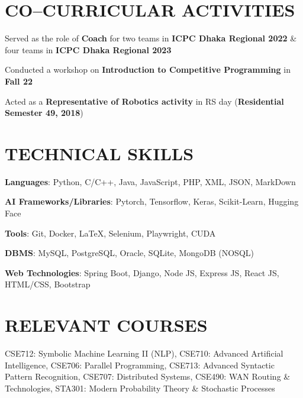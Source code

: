 \documentclass[letterpaper,10.5pt]{article}
\begin{document}
\newpage
\section{CO--CURRICULAR ACTIVITIES}

\begin{itemize}[leftmargin=0.2in, label={}, parsep=-3pt]
  \small{
  \item [\ding{109}]{
        Served as the role of \textbf{Coach} for two teams in \textbf{ICPC Dhaka Regional 2022} \& four teams in \textbf{ICPC Dhaka Regional 2023}} \\
  \item [\ding{109}]{Conducted a workshop on \textbf{Introduction to Competitive Programming} in \textbf{Fall 22}}
  \item [\ding{109}]{Acted as a \textbf{Representative of Robotics activity} in RS day (\textbf{Residential Semester 49, 2018})}
        }
\end{itemize}
\vspace{-16pt}


\section{TECHNICAL SKILLS}
\vspace{-0.5pt}
\begin{itemize}[leftmargin=0in, label={}, parsep=-2pt]
  \small{\item{
                \textbf{Languages}{: Python, C/C++, Java, JavaScript, PHP, XML, JSON, MarkDown}}
    \item{\textbf{AI Frameworks/Libraries}{: Pytorch, Tensorflow, Keras, Scikit-Learn, Hugging Face}}
    \item{\textbf{Tools}{: Git, Docker, \LaTeX, Selenium, Playwright, CUDA}}
    \item{\textbf{DBMS}{: MySQL, PostgreSQL, Oracle, SQLite, MongoDB (NOSQL)}}
    \item{\textbf{Web Technologies}{: Spring Boot, Django, Node JS, Express JS, React JS, HTML/CSS, Bootstrap}}
  }
\end{itemize}
\vspace{-16pt}

\section{RELEVANT COURSES}
CSE712: Symbolic Machine Learning II (NLP),
CSE710: Advanced Artificial Intelligence,
CSE706: Parallel Programming,
CSE713: Advanced Syntactic Pattern Recognition,
CSE707: Distributed Systems,
CSE490: WAN Routing \& Technologies,
STA301: Modern Probability Theory \& Stochastic Processes
\end{document}
